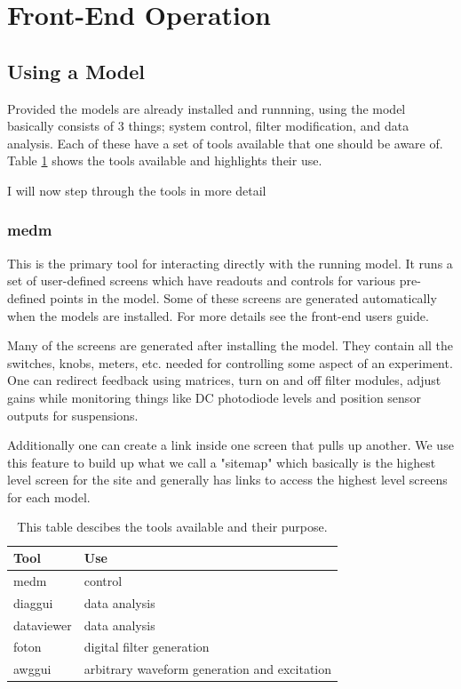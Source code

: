 \section{Front-End Operation}

\subsection{Using a Model}

Provided the models are already installed and runnning, using the model
basically consists of 3 things; system control, filter
modification, and data analysis. Each of these have a set of tools available
that one should be aware of. Table \ref{table:fetools} shows the tools available
and highlights their use.

I will now step through the tools in more detail

\subsubsection{medm}
This is the primary tool for interacting directly with the running model. It
runs a set of user-defined screens which have readouts and controls for various
pre-defined points in the model. Some of these screens are generated
automatically when the models are installed. For more details see
the front-end users guide.

Many of the screens are generated after installing the model. They contain all
the switches, knobs, meters, etc. needed for controlling some aspect of an
experiment. One can redirect feedback using matrices, turn on and off filter
modules, adjust gains while monitoring things like DC photodiode levels and
position sensor outputs for suspensions.

Additionally one can create a link inside one screen that pulls up another. We
use this feature to build up what we call a "sitemap" which basically is the
highest level screen for the site and generally has links to access the
highest level screens for each model.

\begin{table}
\begin{center}
\begin{tabular}{ | l | l | }
\hline
Tool & Use \\
\hline
medm & control \\
diaggui & data analysis \\
dataviewer & data analysis \\
foton & digital filter generation \\
awggui & arbitrary waveform generation and excitation \\
\hline
\end{tabular}
\end{center}
\caption[Front-End Tools]{This table descibes the tools available and their
purpose.
}
\label{table:fetools}
\end{table}

